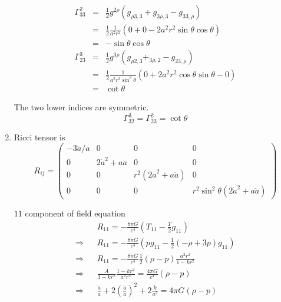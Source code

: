 \documentclass[12pt,a4paper]{article}
\begin{document}
\begin{enumerate}
\begin{eqnarray*}
	\Gamma^2_{33} &=& \frac12 g^{2\rho}( g_{\rho 3,3} + g_{3\rho,3} - g_{33,\rho} ) \\
	&=& \frac 12 \frac{1}{a^2r^2} ( 0 + 0 - 2a^2r^2\sin\theta\cos\theta ) \\
	&=& - \sin\theta\cos\theta \\
	\Gamma^3_{23} &=& \frac 1 2 g^{3\rho} ( g_{\rho 2 ,3} + _{3\rho,2} - g_{23,\rho} ) \\
	&=& \frac 1 2 \frac{1}{a^2r^2\sin^2\theta} ( 0 + 2a^2r^2 \cos\theta\sin\theta - 0 ) \\
	&=& \cot\theta
\end{eqnarray*}

The two lower indices are symmetric.
\begin{equation*}
	\Gamma^3_{32} = \Gamma^2_{23} = \cot\theta
\end{equation*}




\item

Ricci tensor is
\begin{equation*}
R_{ij} = 	\begin{pmatrix}
	-3\ddot a/a & 0 & 0 & 0 \\
	0 & 2\dot a ^2 + a\ddot a & 0 & 0\\
	0 & 0 &r^2 (2\dot a^2 + a\ddot a) & 0 \\
	0 & 0 & 0 & r^2\sin^2\theta ( 2\dot a^2 + a\ddot a)
	\end{pmatrix}
\end{equation*}



$11$ component of field equation
\begin{eqnarray*}
	&& R_{11} = -\frac{8\pi G}{c^4} ( T_{11} - \frac{T}{2}g_{11} ) \\
\Rightarrow &&	R_{11}= -\frac{8\pi G}{c^4} ( p g_{11} - \frac{1}{2} (-\rho + 3p) g_{11} ) \\
\Rightarrow && R_{11} = - \frac{8\pi G}{c^4}\frac 1 2 (\rho - p) \frac{a^2 r^2}{1 - k r^2} \\
\Rightarrow && \frac{A}{1-kr^2}\frac{1-kr^2}{a^2r^2} = \frac{4\pi G}{c^4} (\rho - p) \\
\Rightarrow && \frac{\ddot a}{a} + 2 \left(\frac{\dot a}{a}\right)^2 + 2 \frac{k}{a^2} = 4\pi G (\rho - p)
\end{eqnarray*}








\end{enumerate}
\end{document}
